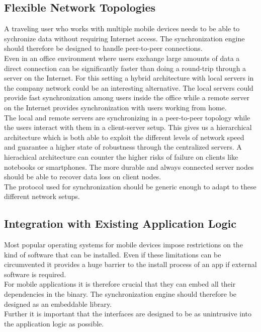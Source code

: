 \subsection{Flexible Network Topologies}
\label{sec:requirements.topologies}
A traveling user who works with multiple mobile devices needs to be able to sychronize data without requiring Internet access.
The synchronization engine should therefore be designed to handle peer-to-peer connections.\\
Even in an office environment where users exchange large amounts of data a direct connection can be significantly faster than doing a round-trip through a server on the Internet.
For this setting a hybrid architecture with local servers in the company network could be an interesting alternative.
The local servers could provide fast synchronization among users inside the office while a remote server on the Internet provides synchronization with users working from home.\\
The local and remote servers are synchronizing in a peer-to-peer topology while the users interact with them in a client-server setup.
This gives us a hierarchical architecture which is both able to exploit the different levels of network speed and guarantee a higher state of robustness through the centralized servers.
A hierachical architecture can counter the higher risks of failure on clients like notebooks or smartphones.
The more durable and always connected server nodes should be able to recover data loss on client nodes.\\
The protocol used for synchronization should be generic enough to adapt to these different network setups.

\subsection{Integration with Existing Application Logic}
Most popular operating systems for mobile devices impose restrictions on the kind of software that can be installed.
Even if these limitations can be circumvented it provides a huge barrier to the install process of an app if external software is required.\\
For mobile applications it is therefore crucial that they can embed all their dependencies in the binary.
The synchronization engine should therefore be designed as an embeddable library.\\
Further it is important that the interfaces are designed to be as unintrusive into the application logic as possible.\\


